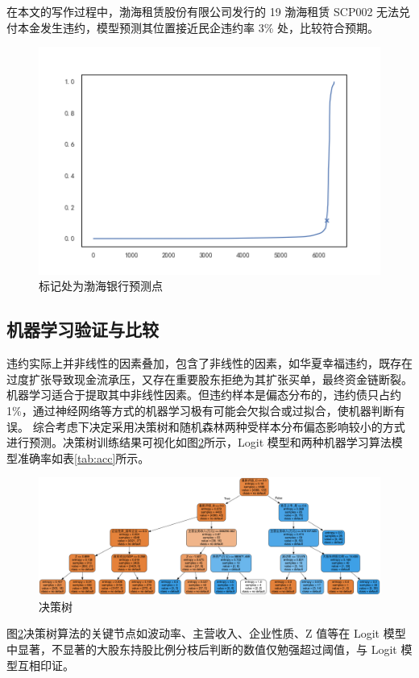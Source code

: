 在本文的写作过程中，渤海租赁股份有限公司发行的 19 渤海租赁 SCP002 无法兑付本金发生违约，模型预测其位置接近民企违约率 3\% 处，比较符合预期。
\begin{figure}[h]
	\centering
	\includegraphics[width=0.9\linewidth]{./data/渤海银行.png}
	\caption{标记处为渤海银行预测点}
	\label{fig:bhyh}
\end{figure}

\subsection{机器学习验证与比较}
违约实际上并非线性的因素叠加，包含了非线性的因素，如华夏幸福违约，既存在过度扩张导致现金流承压，又存在重要股东拒绝为其扩张买单，最终资金链断裂。
机器学习适合于提取其中非线性因素。但违约样本是偏态分布的，违约债只占约 1\%，通过神经网络等方式的机器学习极有可能会欠拟合或过拟合，使机器判断有误。
综合考虑下决定采用决策树和随机森林两种受样本分布偏态影响较小的方式进行预测。决策树训练结果可视化如图\ref{fig:decision_tree}所示，Logit 模型和两种机器学习算法模型准确率如表\ref{tab:acc}所示。


\begin{figure}[h]
	\centering
	\includegraphics[width=.9\linewidth]{./data/decision_tree.png}
	\caption{\label{fig:decision_tree}决策树}
\end{figure}

图\ref{fig:decision_tree}决策树算法的关键节点如波动率、主营收入、企业性质、Z 值等在 Logit 模型中显著，不显著的大股东持股比例分枝后判断的数值仅勉强超过阈值，与 Logit 模型互相印证。

